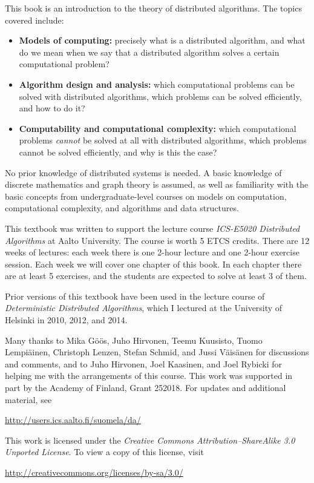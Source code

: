 
This book is an introduction to the theory of distributed algorithms. The topics covered include:
\begin{itemize}
    \item \textbf{Models of computing:} precisely what is a distributed algorithm, and what do we mean when we say that a distributed algorithm solves a certain computational problem?
    \item \textbf{Algorithm design and analysis:} which computational problems can be solved with distributed algorithms, which problems can be solved efficiently, and how to do it?
    \item \textbf{Computability and computational complexity:} which computational problems \emph{cannot} be solved at all with distributed algorithms, which problems cannot be solved efficiently, and why is this the case?
\end{itemize}
No prior knowledge of distributed systems is needed. A basic knowledge of discrete mathematics and graph theory is assumed, as well as familiarity with the basic concepts from undergraduate-level courses on models on computation, computational complexity, and algorithms and data structures.



This textbook was written to support the lecture course \emph{ICS-E5020 Distributed Algorithms} at Aalto University. The course is worth 5 ETCS credits. There are 12 weeks of lectures: each week there is one 2-hour lecture and one 2-hour exercise session. Each week we will cover one chapter of this book. In each chapter there are at least 5 exercises, and the students are expected to solve at least 3 of them.

Prior versions of this textbook have been used in the lecture course of \emph{Deterministic Distributed Algorithms}, which I lectured at the University of Helsinki in 2010, 2012, and 2014.



Many thanks to Mika G\"o\"os, Juho Hirvonen, Tee\-mu Kuu\-sisto, Tuo\-mo Lem\-pi\"a\-inen, Christoph Lenzen, Stefan Schmid, and Jussi V\"ai\-s\"a\-nen for discussions and comments, and to Juho Hirvonen, Joel Kaasinen, and Joel Rybicki for helping me with the arrangements of this course. This work was supported in part by the Academy of Finland, Grant 252018. For updates and additional material, see
\begin{center}
    \url{http://users.ics.aalto.fi/suomela/da/}
\end{center}



\begin{samepage}
This work is licensed under the \emph{Creative Commons Attribution--ShareAlike 3.0 Unported License}. To view a copy of this license, visit
\begin{center}
    \url{http://creativecommons.org/licenses/by-sa/3.0/}
\end{center}
\end{samepage}
